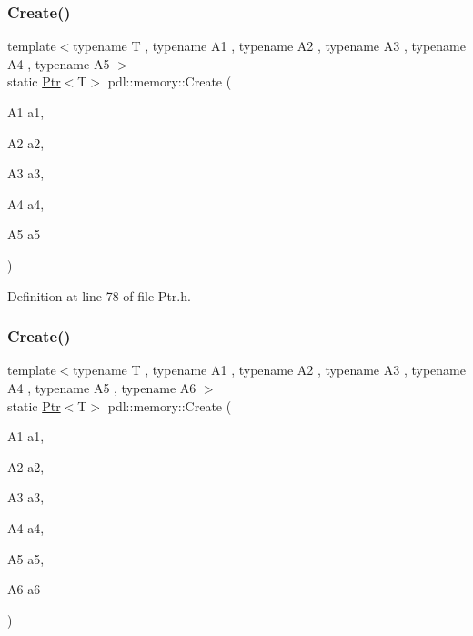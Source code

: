 \subsubsection{\texorpdfstring{Create()}{Create()}\hspace{0.1cm}{\footnotesize\ttfamily [6/8]}}
{\footnotesize\ttfamily template$<$typename T , typename A1 , typename A2 , typename A3 , typename A4 , typename A5 $>$ \\
static \mbox{\hyperlink{classpdl_1_1memory_1_1_ptr}{Ptr}}$<$T$>$ pdl\+::memory\+::\+Create (\begin{DoxyParamCaption}\item[{A1}]{a1,  }\item[{A2}]{a2,  }\item[{A3}]{a3,  }\item[{A4}]{a4,  }\item[{A5}]{a5 }\end{DoxyParamCaption})\hspace{0.3cm}{\ttfamily [static]}}



Definition at line 78 of file Ptr.\+h.


\begin{DoxyCode}{0}

\end{DoxyCode}
\mbox{\label{namespacepdl_1_1memory_a7501737ccf830d8a2af2e4a2e845ef67}} 
\subsubsection{\texorpdfstring{Create()}{Create()}\hspace{0.1cm}{\footnotesize\ttfamily [7/8]}}
{\footnotesize\ttfamily template$<$typename T , typename A1 , typename A2 , typename A3 , typename A4 , typename A5 , typename A6 $>$ \\
static \mbox{\hyperlink{classpdl_1_1memory_1_1_ptr}{Ptr}}$<$T$>$ pdl\+::memory\+::\+Create (\begin{DoxyParamCaption}\item[{A1}]{a1,  }\item[{A2}]{a2,  }\item[{A3}]{a3,  }\item[{A4}]{a4,  }\item[{A5}]{a5,  }\item[{A6}]{a6 }\end{DoxyParamCaption})\hspace{0.3cm}{\ttfamily [static]}}



